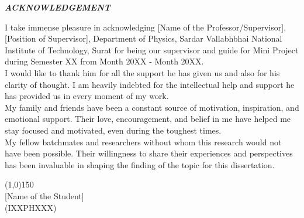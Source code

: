 \begin{center}
    {\Large \textbf \emph{ACKNOWLEDGEMENT}}
\end{center}

\vspace{10pt}
\begin{spacing}{1.5}
I take immense pleasure in acknowledging [Name of the Professor/Supervisor], [Position of Supervisor], Department of Physics, Sardar Vallabhbhai National Institute of Technology, Surat for being our supervisor and guide for Mini Project during Semester XX from Month 20XX - Month 20XX.
\vspace{8pt}
\\
I would like to thank him for all the support he has given us and also for his clarity of thought. I am heavily indebted for the intellectual help and support he has provided us in every moment of my work. 
\vspace{8pt}
\\
My family and friends have been a constant source of motivation, inspiration, and emotional support. Their love, encouragement, and belief in me have helped me stay focused and motivated, even during the toughest times.
\vspace{8pt}
\\
My fellow batchmates and researchers without whom this research would not have been possible. Their willingness to share their experiences and perspectives has been invaluable in shaping the finding of the topic for this dissertation.
\end{spacing}
\vspace{100pt}

\begin{multicols}{2}
    \begin{center}
        
    \end{center}

    \columnbreak
        
    \begin{center}
        \line(1,0){150} \\
        {[Name of the Student]} \\ 
        {(IXXPHXXX)}
    \end{center}
\end{multicols}

        

        
        
